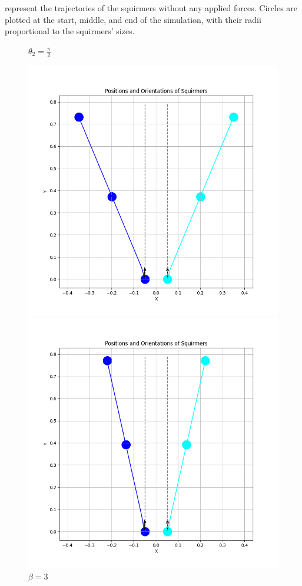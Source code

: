 \documentclass{article}
\begin{document}
 represent the trajectories of the squirmers without any applied forces. Circles are plotted at the start, 
 middle, and end of the simulation, with their radii proportional to the squirmers' sizes.
\newpage
 \begin{figure}[H]
    \centering
    \textbf{$\theta_2 = \frac{\pi}{2}$}\par\medskip
    \begin{minipage}{0.49\textwidth}
        \includegraphics[width=1.1\textwidth]{graphs/simulations/sim_sq_sq/beta3/pi_2_.png}
        \caption{\footnotesize $\beta = 3$}
    \end{minipage}\hfill
    \begin{minipage}{0.49\textwidth}
        \includegraphics[width=1.1\textwidth]{graphs/simulations/sim_sq_sq/betam3/pi_2_.png}

\end{minipage}
\end{figure}
\end{document}
